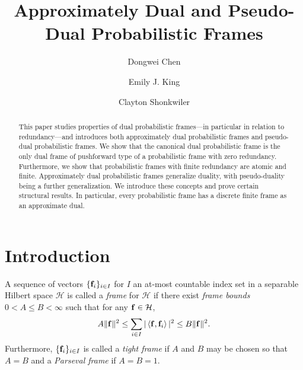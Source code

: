 \documentclass{amsart}
\numberwithin{equation}{section}
\theoremstyle{plain}
\theoremstyle{remark}
\theoremstyle{definition}
\begin{document}

\title{Approximately Dual and Pseudo-Dual Probabilistic Frames}


\author{Dongwei Chen}
\address{Department of Mathematics, Colorado State University, Fort Collins, CO, US, 80523}

\author{Emily J. King}
\address{Department of Mathematics, Colorado State University, Fort Collins, CO, US, 80523}

\author{Clayton Shonkwiler}
\address{Department of Mathematics, Colorado State University, Fort Collins, CO, US, 80523}
 
\begin{abstract}
This paper studies properties of dual probabilistic frames---in particular in relation to redundancy---and introduces both approximately dual probabilistic frames and pseudo-dual probabilistic frames. We show that the canonical dual probabilistic frame is the only dual frame of pushforward type of a probabilistic frame with zero redundancy.  Furthermore, we show that probabilistic frames with finite redundancy are atomic and finite. Approximately dual probabilistic frames generalize duality, with pseudo-duality being a further generalization. We introduce these concepts and prove certain structural results. In particular, every probabilistic frame has a discrete finite frame as an approximate dual.
\end{abstract}

\maketitle
\section{Introduction}

A sequence of vectors $\{{\bf f}_i\}_{i \in I}$ for $I$ an at-most countable index set in a separable Hilbert space $\mathcal{H}$ is called a \textit{frame} for $\mathcal{H}$ if  there exist \emph{frame bounds} $0<A \leq B < \infty$ such that for any ${\bf f} \in \mathcal{H}$, 
\begin{equation}\label{eqn:framedef}
    A \Vert {\bf f}  \Vert^2 \leq\sum_{i \in I} \vert \left\langle {\bf f},{\bf f}_i \right\rangle \vert ^2  \leq B\Vert {\bf f} \Vert^2.
\end{equation} 
Furthermore, $\{{\bf f}_i\}_{i \in I}$ is called a \emph{tight frame} if $A$ and $B$ may be chosen so that $A = B$ and a \emph{Parseval frame} if $A = B=1$. 
\end{document}
